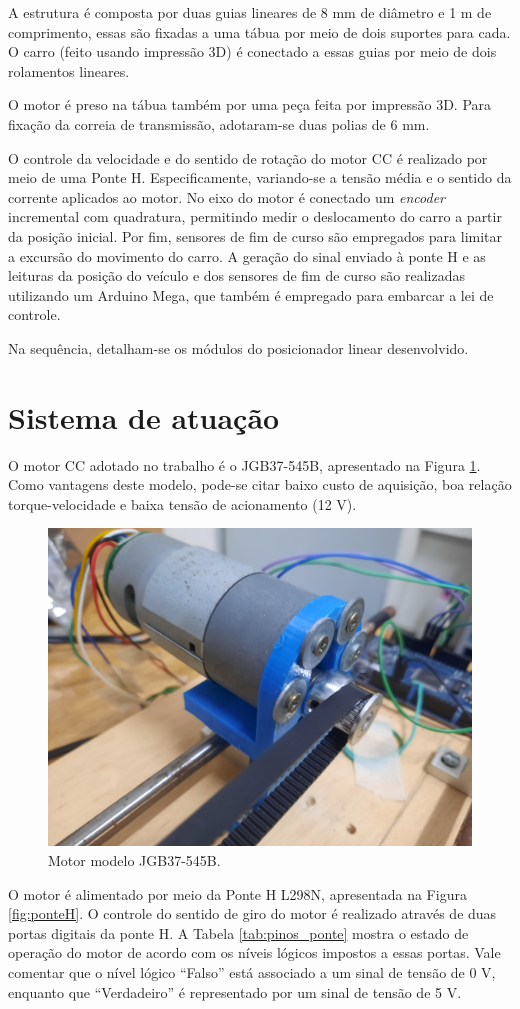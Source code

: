 A estrutura é composta por duas guias lineares de 8 mm de diâmetro e 1 m de comprimento, essas são fixadas a uma tábua por meio de dois suportes para cada. O carro (feito usando impressão 3D) é conectado a essas guias por meio de dois rolamentos lineares. 

O motor é preso na tábua também por uma peça feita por impressão 3D. Para fixação da correia de transmissão, adotaram-se duas polias de 6 mm.

O controle da velocidade e do sentido de rotação do motor CC é realizado por meio de uma Ponte H. Especificamente, variando-se a tensão média e o sentido da corrente aplicados ao motor. No eixo do motor é conectado um \textit{encoder} incremental com quadratura, permitindo medir o deslocamento do carro a partir da posição inicial. Por fim, sensores de fim de curso são empregados para limitar a excursão do movimento do carro. A geração do sinal enviado à ponte H e as leituras da posição do veículo e dos sensores de fim de curso são realizadas utilizando um Arduino Mega, que também é empregado para embarcar a lei de controle.

Na sequência, detalham-se os módulos do posicionador linear desenvolvido.

\section{Sistema de atuação}
O motor CC adotado no trabalho é o JGB37-545B, apresentado na Figura \ref{fig:motor}. Como vantagens deste modelo, pode-se citar baixo custo de aquisição, boa relação torque-velocidade e baixa tensão de acionamento (12 V). 

\begin{figure}[H]
    \centering
    \includegraphics[width=0.5\linewidth]{figuras/motor.jpg}
    \caption[Motor modelo JGB37-545B]{Motor modelo JGB37-545B.}
    \label{fig:motor}
\end{figure}

O motor é alimentado por meio da Ponte H L298N, apresentada na Figura \ref{fig:ponteH}. O controle do sentido de giro do motor é realizado através de duas portas digitais da ponte H. A Tabela \ref{tab:pinos_ponte} mostra o estado de operação do motor de acordo com os níveis lógicos impostos a essas portas. Vale comentar que o nível lógico ``Falso'' está associado a um sinal de tensão de 0 V, enquanto que ``Verdadeiro'' é representado por um sinal de tensão de 5 V. 

